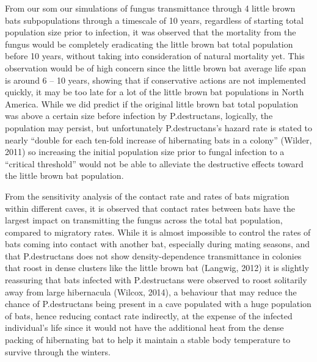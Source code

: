 \documentclass[12pt]{article}
\begin{document}
From our som our simulations of fungus transmittance through 4 little brown bats subpopulations through a timescale of 10 years, regardless of starting total population size prior to infection, it was observed that the mortality from the fungus would be completely eradicating the little brown bat total population before 10 years, without taking into consideration of natural mortality yet. This observation would be of high concern since the little brown bat average life span is around 6 – 10 years, showing that if conservative actions are not implemented quickly, it may be too late for a lot of the little brown bat populations in North America. While we did predict if the original little brown bat total population was above a certain size before infection by P.destructans, logically, the population may persist, but unfortunately P.destructans’s hazard rate is stated to nearly “double for each ten-fold increase of hibernating bats in a colony” (Wilder, 2011) so increasing the initial population size prior to fungal infection to a “critical threshold” would not be able to alleviate the destructive effects toward the little brown bat population.
 
From the sensitivity analysis of the contact rate and rates of bats migration within different caves, it is observed that contact rates between bats have the largest impact on transmitting the fungus across the total bat population, compared to migratory rates. While it is almost impossible to control the rates of bats coming into contact with another bat, especially during mating seasons, and that P.destructans does not show density-dependence transmittance in colonies that roost in dense clusters like the little brown bat (Langwig, 2012) it is slightly reassuring that bats infected with P.destructans were observed to roost solitarily away from large hibernacula (Wilcox, 2014), a behaviour that may reduce the chance of P.destructans being present in a cave populated with a huge population of bats, hence reducing contact rate indirectly, at the expense of the infected individual’s life since it would not have the additional heat from the dense packing of hibernating bat to help it maintain a stable body temperature to survive through the winters.       
\end{document}
